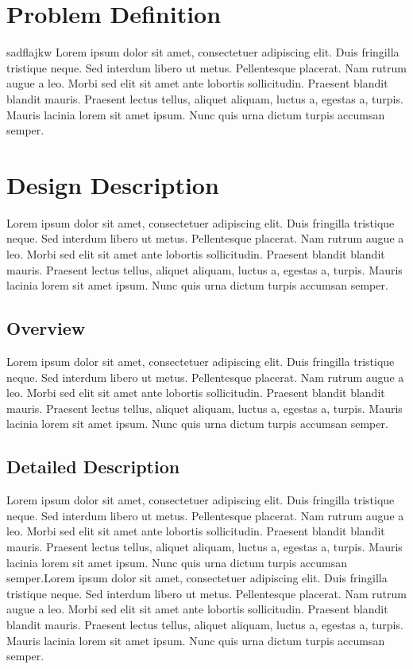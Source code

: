 \documentclass[journal]{IEEEtran}
\begin{document}
\section{Problem Definition}
sadflajkw 
Lorem ipsum dolor sit amet, consectetuer adipiscing elit.
Duis fringilla tristique neque. Sed interdum libero ut metus. Pellentesque placerat. Nam rutrum augue a leo.
Morbi sed elit sit amet ante lobortis sollicitudin. Praesent blandit blandit mauris. Praesent lectus tellus,
aliquet aliquam, luctus a, egestas a, turpis. Mauris lacinia lorem sit amet ipsum. Nunc quis urna dictum
turpis accumsan semper.


\section{Design Description}
Lorem ipsum dolor sit amet, consectetuer adipiscing elit.
Duis fringilla tristique neque. Sed interdum libero ut metus. Pellentesque placerat. Nam rutrum augue a leo.
Morbi sed elit sit amet ante lobortis sollicitudin. Praesent blandit blandit mauris. Praesent lectus tellus,
aliquet aliquam, luctus a, egestas a, turpis. Mauris lacinia lorem sit amet ipsum. Nunc quis urna dictum
turpis accumsan semper.
\subsection{Overview}
Lorem ipsum dolor sit amet, consectetuer adipiscing elit.
Duis fringilla tristique neque. Sed interdum libero ut metus. Pellentesque placerat. Nam rutrum augue a leo.
Morbi sed elit sit amet ante lobortis sollicitudin. Praesent blandit blandit mauris. Praesent lectus tellus,
aliquet aliquam, luctus a, egestas a, turpis. Mauris lacinia lorem sit amet ipsum. Nunc quis urna dictum
turpis accumsan semper.
\subsection{Detailed Description}
Lorem ipsum dolor sit amet, consectetuer adipiscing elit.
Duis fringilla tristique neque. Sed interdum libero ut metus. Pellentesque placerat. Nam rutrum augue a leo.
Morbi sed elit sit amet ante lobortis sollicitudin. Praesent blandit blandit mauris. Praesent lectus tellus,
aliquet aliquam, luctus a, egestas a, turpis. Mauris lacinia lorem sit amet ipsum. Nunc quis urna dictum
turpis accumsan semper.Lorem ipsum dolor sit amet, consectetuer adipiscing elit.
Duis fringilla tristique neque. Sed interdum libero ut metus. Pellentesque placerat. Nam rutrum augue a leo.
Morbi sed elit sit amet ante lobortis sollicitudin. Praesent blandit blandit mauris. Praesent lectus tellus,
aliquet aliquam, luctus a, egestas a, turpis. Mauris lacinia lorem sit amet ipsum. Nunc quis urna dictum
turpis accumsan semper.
\end{document}
